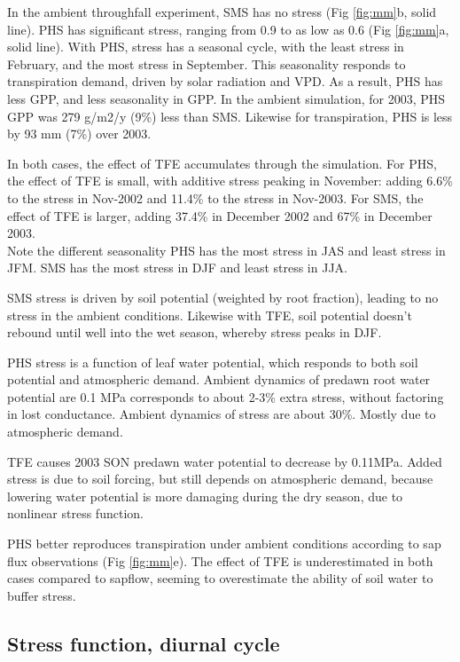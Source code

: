 \documentclass[draft,linenumbers]{agujournal}
\begin{document}
In the ambient throughfall experiment, SMS has no stress (Fig \ref{fig:mm}b, solid line). 
PHS has significant stress, ranging from 0.9 to as low as 0.6 (Fig \ref{fig:mm}a, solid line).
With PHS, stress has a seasonal cycle, with the least stress in February, and the most stress in September.
This seasonality responds to transpiration demand, driven by solar radiation and VPD.
As a result, PHS has less GPP, and less seasonality in GPP. 
In the ambient simulation, for 2003, PHS GPP was 279 g/m2/y (9\%) less than SMS.
Likewise for transpiration, PHS is less by 93 mm (7\%) over 2003.

In both cases, the effect of TFE accumulates through the simulation. 
For PHS, the effect of TFE is small, with additive stress peaking in November: 
adding 6.6\% to the stress in Nov-2002 and 11.4\% to the stress in Nov-2003.
For SMS, the effect of TFE is larger, adding 37.4\% in December 2002  and 67\% in December 2003. \\
Note the different seasonality
PHS has the most stress in JAS and least stress in JFM. 
SMS has the most stress in DJF and least stress in JJA.

SMS stress is driven by soil potential (weighted by root fraction), leading to no stress in the ambient conditions.
Likewise with TFE, soil potential doesn't rebound until well into the wet season, whereby stress peaks in DJF.

PHS stress is a function of leaf water potential, which responds to both soil potential and atmospheric demand. 
Ambient dynamics of predawn root water potential are 0.1 MPa corresponds to about 2-3\% extra stress, without factoring in lost conductance.
Ambient dynamics of stress are about 30\%. Mostly due to atmospheric demand.

TFE causes 2003 SON predawn water potential to decrease by 0.11MPa. 
Added stress is due to soil forcing, but still depends on atmospheric demand, 
because lowering water potential is more damaging during the dry season,
due to nonlinear stress function.

PHS better reproduces transpiration under ambient conditions according to sap flux observations (Fig \ref{fig:mm}e). 
\citep{restrepo2017}
The effect of TFE is underestimated in both cases compared to sapflow, seeming to overestimate the ability of soil water to buffer stress.

\subsection{Stress function, diurnal cycle}
\end{document}
